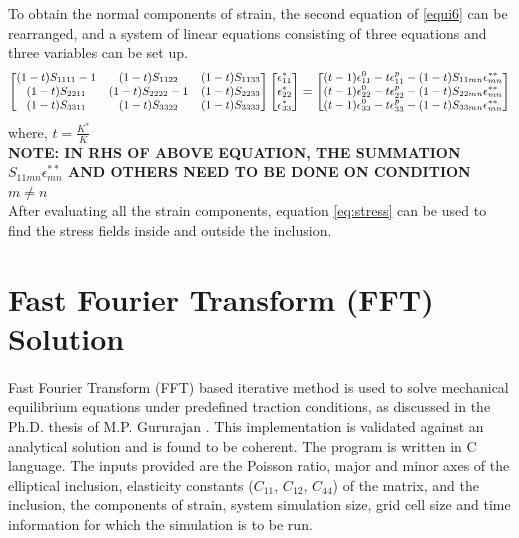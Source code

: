 \documentclass[12pt, a4paper]{report}
\begin{document}
To obtain the normal components of strain, the second equation of \ref{equi6} can be rearranged, and a system of linear equations consisting of three equations and three variables can be set up.
\begin{equation}
\small
\begin{bmatrix}
(1-t)S_{1111} - 1 & (1-t)S_{1122} & (1-t)S_{1133} \\
(1-t)S_{2211} & (1-t)S_{2222} - 1 & (1-t)S_{2233} \\
(1-t)S_{3311} & (1-t)S_{3322} & (1-t)S_{3333} \\
\end{bmatrix}
\begin{bmatrix}
    \epsilon_{11}^{*} \\
    \epsilon_{22}^{*} \\
    \epsilon_{33}^{*} \\
\end{bmatrix} = 
\begin{bmatrix}
    (t-1)\epsilon_{11}^{0} - t\epsilon_{11}^{p} - (1-t)S_{11mn}\epsilon_{mn}^{**} \\
    (t-1)\epsilon_{22}^{0} - t\epsilon_{22}^{p} - (1-t)S_{22mn}\epsilon_{mn}^{**} \\
    (t-1)\epsilon_{33}^{0} - t\epsilon_{33}^{p} - (1-t)S_{33mn}\epsilon_{mn}^{**} \\
\end{bmatrix}
\end{equation}
where, $t = \frac{K^*}{K}$ \\


\textbf{NOTE: IN RHS OF ABOVE EQUATION, THE SUMMATION $S_{11mn}\epsilon_{mn}^{**}$ AND OTHERS NEED TO BE DONE ON CONDITION $m \neq n$} \\

After evaluating all the strain components, equation \ref{eq:stress} can be used to find the stress fields inside and outside the inclusion.

\section{Fast Fourier Transform (FFT) Solution}
\paragraph{}
Fast Fourier Transform (FFT) based iterative method is used to solve mechanical equilibrium equations under predefined traction conditions, as discussed in the Ph.D. thesis of M.P. Gururajan \cite{Guru_thesis}. This implementation is validated against an analytical solution and is found to be coherent. The program is written in C language. The inputs provided are the Poisson ratio, major and minor axes of the elliptical inclusion, elasticity constants ($C_{11}$, $C_{12}$, $C_{44}$) of the matrix, and the inclusion, the components of strain, system simulation size, grid cell size and time information for which the simulation is to be run.
\end{document}
